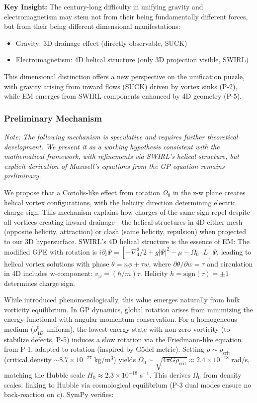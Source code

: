 \textbf{Key Insight:} The century-long difficulty in unifying gravity and electromagnetism may stem not from their being fundamentally different forces, but from their being different dimensional manifestations:
\begin{itemize}
\item Gravity: 3D drainage effect (directly observable, SUCK)
\item Electromagnetism: 4D helical structure (only 3D projection visible, SWIRL)
\end{itemize}
This dimensional distinction offers a new perspective on the unification puzzle, with gravity arising from inward flows (SUCK) driven by vortex sinks (P-2), while EM emerges from SWIRL components enhanced by 4D geometry (P-5).

\subsubsection{Preliminary Mechanism}
\textit{Note: The following mechanism is speculative and requires further theoretical development. We present it as a working hypothesis consistent with the mathematical framework, with refinements via SWIRL's helical structure, but explicit derivation of Maxwell's equations from the GP equation remains preliminary.}

We propose that a Coriolis-like effect from rotation $\Omega_0$ in the z-w plane creates helical vortex configurations, with the helicity direction determining electric charge sign. This mechanism explains how charges of the same sign repel despite all vortices creating inward drainage---the helical structures in 4D either mesh (opposite helicity, attraction) or clash (same helicity, repulsion) when projected to our 3D hypersurface. SWIRL's 4D helical structure is the essence of EM: The modified GPE with rotation is $i\partial_t\Psi = [-\nabla_4^2/2 + g|\Psi|^2 - \mu - \Omega_0\cdot L]\Psi$, leading to helical vortex solutions with phase $\theta = n\phi + \tau w$, where $\partial\theta/\partial w = \tau$ and circulation in 4D includes w-component: $v_w = (\hbar/m)\tau$. Helicity $h = \text{sign}(\tau) = \pm1$ determines charge sign.

While introduced phenomenologically, this value emerges naturally from bulk vorticity equilibrium. In GP dynamics, global rotation arises from minimizing the energy functional with angular momentum conservation. For a homogeneous medium ($\rho_{4D}^0$ uniform), the lowest-energy state with non-zero vorticity (to stabilize defects, P-5) induces a slow rotation via the Friedmann-like equation from P-1, adapted to rotation (inspired by G\"{o}del metric). Setting $\rho \sim \rho_{\text{crit}}$ (critical density $\sim 8.7 \times 10^{-27}$ kg/m$^3$) yields $\Omega_0 \sim \sqrt{4\pi G \rho_{\text{crit}}} \approx 2.4 \times 10^{-18}$ rad/s, matching the Hubble scale $H_0 \approx 2.3 \times 10^{-18}$ s$^{-1}$. This derives $\Omega_0$ from density scales, linking to Hubble via cosmological equilibrium (P-3 dual modes ensure no back-reaction on $c$). SymPy verifies:

